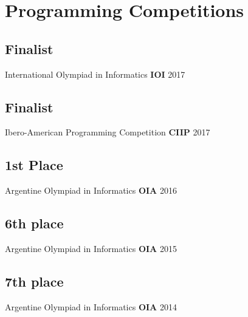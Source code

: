 \section{Programming Competiti\textcolor{mycolor}{ons}}
  \subsection{Finalist}
    International Olympiad in Informatics {\bfseries\textcolor{mycolor}{IOI}}
    {\textcolor{mygrey}{\hspace*{\fill}2017}}
  \subsection{Finalist}
    Ibero-American Programming Competition {\bfseries\textcolor{mycolor}{CIIP}}
    {\textcolor{mygrey}{\hspace*{\fill}2017}}
  \subsection{1st Place}
    Argentine Olympiad in Informatics {\bfseries\textcolor{mycolor}{OIA} }
    {\textcolor{mygrey}{\hspace*{\fill}2016}}
  \subsection{6th place}
    Argentine Olympiad in Informatics {\bfseries\textcolor{mycolor}{OIA}}
    {\textcolor{mygrey}{\hspace*{\fill}2015}}
  \subsection{7th place}
    Argentine Olympiad in Informatics {\bfseries\textcolor{mycolor}{OIA}}
    {\textcolor{mygrey}{\hspace*{\fill}2014}}

